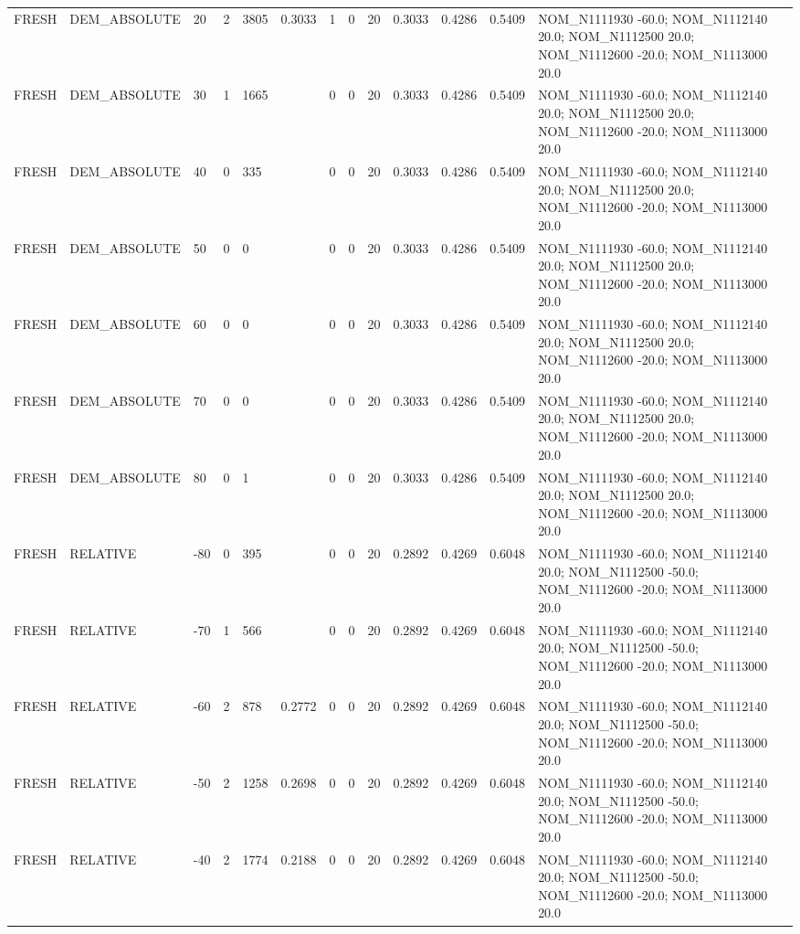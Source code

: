 \begin{table}[ht]
\begin{tabular}{lllllllllllll}
FRESH & DEM\_ABSOLUTE & 20 & 2 & 3805 & 0.3033 & 1 & 0 & 20 & 0.3033 & 0.4286 & 0.5409 & NOM\_N1111930 -60.0; NOM\_N1112140 20.0; NOM\_N1112500 20.0; NOM\_N1112600 -20.0; NOM\_N1113000 20.0 \\
FRESH & DEM\_ABSOLUTE & 30 & 1 & 1665 &  & 0 & 0 & 20 & 0.3033 & 0.4286 & 0.5409 & NOM\_N1111930 -60.0; NOM\_N1112140 20.0; NOM\_N1112500 20.0; NOM\_N1112600 -20.0; NOM\_N1113000 20.0 \\
FRESH & DEM\_ABSOLUTE & 40 & 0 & 335 &  & 0 & 0 & 20 & 0.3033 & 0.4286 & 0.5409 & NOM\_N1111930 -60.0; NOM\_N1112140 20.0; NOM\_N1112500 20.0; NOM\_N1112600 -20.0; NOM\_N1113000 20.0 \\
FRESH & DEM\_ABSOLUTE & 50 & 0 & 0 &  & 0 & 0 & 20 & 0.3033 & 0.4286 & 0.5409 & NOM\_N1111930 -60.0; NOM\_N1112140 20.0; NOM\_N1112500 20.0; NOM\_N1112600 -20.0; NOM\_N1113000 20.0 \\
FRESH & DEM\_ABSOLUTE & 60 & 0 & 0 &  & 0 & 0 & 20 & 0.3033 & 0.4286 & 0.5409 & NOM\_N1111930 -60.0; NOM\_N1112140 20.0; NOM\_N1112500 20.0; NOM\_N1112600 -20.0; NOM\_N1113000 20.0 \\
FRESH & DEM\_ABSOLUTE & 70 & 0 & 0 &  & 0 & 0 & 20 & 0.3033 & 0.4286 & 0.5409 & NOM\_N1111930 -60.0; NOM\_N1112140 20.0; NOM\_N1112500 20.0; NOM\_N1112600 -20.0; NOM\_N1113000 20.0 \\
FRESH & DEM\_ABSOLUTE & 80 & 0 & 1 &  & 0 & 0 & 20 & 0.3033 & 0.4286 & 0.5409 & NOM\_N1111930 -60.0; NOM\_N1112140 20.0; NOM\_N1112500 20.0; NOM\_N1112600 -20.0; NOM\_N1113000 20.0 \\
FRESH & RELATIVE & -80 & 0 & 395 &  & 0 & 0 & 20 & 0.2892 & 0.4269 & 0.6048 & NOM\_N1111930 -60.0; NOM\_N1112140 20.0; NOM\_N1112500 -50.0; NOM\_N1112600 -20.0; NOM\_N1113000 20.0 \\
FRESH & RELATIVE & -70 & 1 & 566 &  & 0 & 0 & 20 & 0.2892 & 0.4269 & 0.6048 & NOM\_N1111930 -60.0; NOM\_N1112140 20.0; NOM\_N1112500 -50.0; NOM\_N1112600 -20.0; NOM\_N1113000 20.0 \\
FRESH & RELATIVE & -60 & 2 & 878 & 0.2772 & 0 & 0 & 20 & 0.2892 & 0.4269 & 0.6048 & NOM\_N1111930 -60.0; NOM\_N1112140 20.0; NOM\_N1112500 -50.0; NOM\_N1112600 -20.0; NOM\_N1113000 20.0 \\
FRESH & RELATIVE & -50 & 2 & 1258 & 0.2698 & 0 & 0 & 20 & 0.2892 & 0.4269 & 0.6048 & NOM\_N1111930 -60.0; NOM\_N1112140 20.0; NOM\_N1112500 -50.0; NOM\_N1112600 -20.0; NOM\_N1113000 20.0 \\
FRESH & RELATIVE & -40 & 2 & 1774 & 0.2188 & 0 & 0 & 20 & 0.2892 & 0.4269 & 0.6048 & NOM\_N1111930 -60.0; NOM\_N1112140 20.0; NOM\_N1112500 -50.0; NOM\_N1112600 -20.0; NOM\_N1113000 20.0 \\

\end{tabular}
\end{table}
